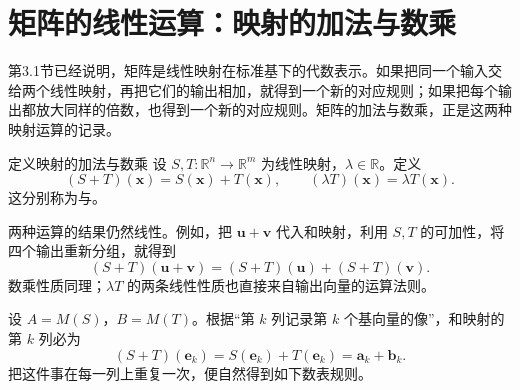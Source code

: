 \documentclass[a4paper,12pt,twoside,openany,fontset=none]{ctexbook}
\newcounter{definition}[chapter]
\newenvironment{definition}[1][]{\begin{defBox}{定义}{#1}}{\end{defBox}}
\numberwithin{equation}{chapter}
\begin{document}
\begingroup
\linespread{1}\fontsize{12pt}{20pt}\selectfont
\setlength{\parskip}{4pt}
\setlength{\abovedisplayskip}{8pt}\setlength{\belowdisplayskip}{8pt}
\newcommand{\OpMat}[2]{\left[\begin{array}{#1}#2\end{array}\right]}
\newcommand{\OpCol}[1]{\left(\begin{array}{r}#1\end{array}\right)}
\newcommand{\OpNote}[1]{\par\smallskip\noindent\textbf{\color{ThreeRose}注意：}#1\par\smallskip}

\clearpage
\section{矩阵的线性运算：映射的加法与数乘}
\label{sec:three-linear-operations}

第3.1节已经说明，矩阵是线性映射在标准基下的代数表示。如果把同一个输入交给两个线性映射，再把它们的输出相加，就得到一个新的对应规则；如果把每个输出都放大同样的倍数，也得到一个新的对应规则。矩阵的加法与数乘，正是这两种映射运算的记录。

\begin{definition}[映射的加法与数乘]
设 $S,T:\mathbb R^n\to\mathbb R^m$ 为线性映射，$\lambda\in\mathbb R$。定义
\[
 (S+T)(\boldsymbol x)=S(\boldsymbol x)+T(\boldsymbol x),\qquad
 (\lambda T)(\boldsymbol x)=\lambda T(\boldsymbol x).
\]
这分别称为与。
\end{definition}

两种运算的结果仍然线性。例如，把 $\boldsymbol u+\boldsymbol v$ 代入和映射，利用 $S,T$ 的可加性，将四个输出重新分组，就得到
\[
 (S+T)(\boldsymbol u+\boldsymbol v)
 =(S+T)(\boldsymbol u)+(S+T)(\boldsymbol v).
\]
数乘性质同理；$\lambda T$ 的两条线性性质也直接来自输出向量的运算法则。

设 $A=M(S)$，$B=M(T)$。根据“第 $k$ 列记录第 $k$ 个基向量的像”，和映射的第 $k$ 列必为
\[
 (S+T)(\boldsymbol e_k)=S(\boldsymbol e_k)+T(\boldsymbol e_k)
 =\boldsymbol a_k+\boldsymbol b_k.
\]
把这件事在每一列上重复一次，便自然得到如下数表规则。
\end{document}
